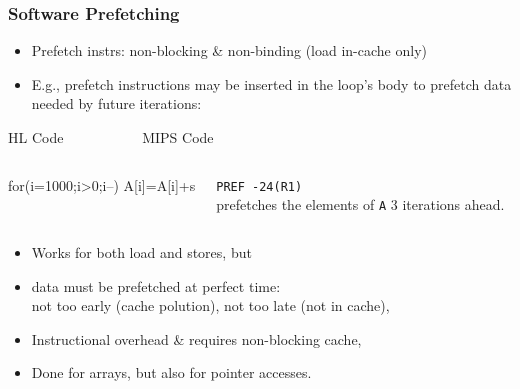 \documentclass{beamer}
\begin{document}
\begin{frame}[fragile,t]
\frametitle{Software Prefetching}

\begin{itemize}
    \item Prefetch instrs: non-blocking \& non-binding (load in-cache only)
    \item E.g., prefetch instructions may be inserted in the loop's body 
            to prefetch data needed by future iterations:
\end  {itemize}

\begin{block}{HL Code{\tt~~~~~~~~~~~}MIPS Code}\vspace{-2ex}
\begin{columns}
\begin{colorcode}[fontsize=\scriptsize]
for(i=1000;i>0;i--)
  A[i]=A[i]+s
\end{colorcode} 
{\tt PREF    -24(R1)}\\
prefetches the elements of {\tt A} 3 iterations ahead.
\end{columns}
\end{block}

\begin{itemize}
    \item Works for both load and stores, but
    \item data must be prefetched at perfect time:\\
            not too early (cache polution), not too late (not in cache),
    \item Instructional overhead \& requires non-blocking cache,
    \item Done for arrays, but also for pointer accesses.
\end  {itemize}
\end{frame}
\end{document}
